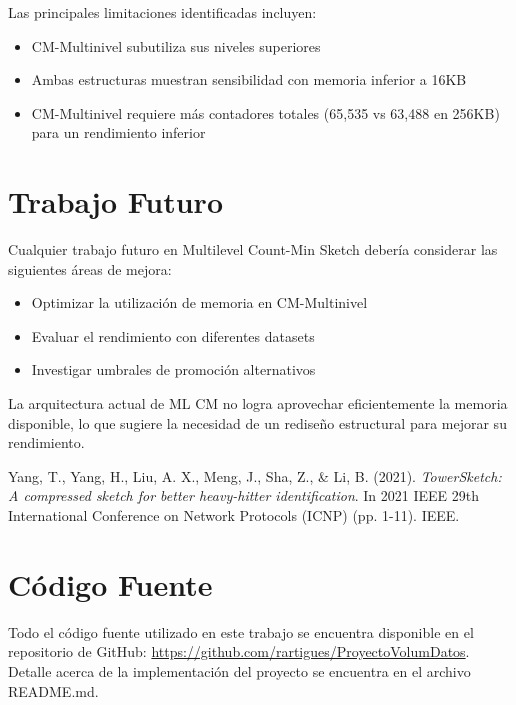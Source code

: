 \documentclass[a4paper,12pt]{article}
\begin{document}
Las principales limitaciones identificadas incluyen:
\begin{itemize}
    \item CM-Multinivel subutiliza sus niveles superiores
    \item Ambas estructuras muestran sensibilidad con memoria inferior a 16KB
    \item CM-Multinivel requiere más contadores totales (65,535 vs 63,488 en 256KB) para un rendimiento inferior
\end{itemize}

\section{Trabajo Futuro}
\noindent Cualquier trabajo futuro en Multilevel Count-Min Sketch debería considerar las siguientes áreas de mejora:
\begin{itemize}
    \item Optimizar la utilización de memoria en CM-Multinivel
    \item Evaluar el rendimiento con diferentes datasets
    \item Investigar umbrales de promoción alternativos
\end{itemize}

\noindent La arquitectura actual de ML CM no logra aprovechar eficientemente la memoria disponible, lo que sugiere la necesidad de un rediseño estructural para mejorar su rendimiento.

\newpage

\begin{thebibliography}{9}

Yang, T., Yang, H., Liu, A. X., Meng, J., Sha, Z., \& Li, B. (2021).
\emph{TowerSketch: A compressed sketch for better heavy-hitter identification}.
In 2021 IEEE 29th International Conference on Network Protocols (ICNP) (pp. 1-11).
IEEE.

\end{thebibliography}

\appendix
\section{Código Fuente}
\noindent Todo el código fuente utilizado en este trabajo se encuentra disponible en el repositorio de GitHub: \url{https://github.com/rartigues/ProyectoVolumDatos}.
Detalle acerca de la implementación del proyecto se encuentra en el archivo README.md.
\end{document}
